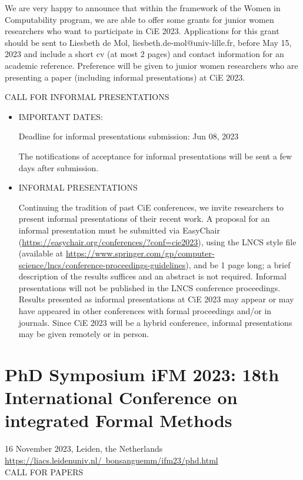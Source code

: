 \documentclass[prodmode,acmtecs]{acmsmall} %
\begin{document}
\begin{itemize}
  We are very happy to announce that within the framework of the Women in Computability program, we are able to offer some grants for junior women researchers who want to participate in CiE 2023. Applications for this grant should be sent to Liesbeth de Mol, liesbeth.de-mol@univ-lille.fr, before May 15, 2023 and include a short cv (at most 2 pages) and contact information for an academic reference. Preference will be given to junior women researchers who are presenting a paper (including informal presentations) at CiE 2023. 
 
\end{itemize}CALL FOR INFORMAL PRESENTATIONS 

\begin{itemize}\item   IMPORTANT DATES: 
 
Deadline for informal presentations submission: Jun 08, 2023 
 
  The notifications of acceptance for informal presentations will be sent a few days after submission. 
 
\item  INFORMAL PRESENTATIONS 
 
  Continuing the tradition of past CiE conferences, we invite researchers to present informal presentations of their recent work. A proposal for an informal presentation must be submitted via EasyChair (\href{https://easychair.org/conferences/?conf=cie2023}{https://easychair.org/conferences/?conf=cie2023}), using the LNCS style file (available at \href{https://www.springer.com/gp/computer-science/lncs/conference-proceedings-guidelines}{https://www.springer.com/gp/computer-science/lncs/conference-proceedings-guidelines}), and be 1 page long; a brief description of the results suffices and an abstract is not required. Informal presentations will not be published in the LNCS conference proceedings. Results presented as informal presentations at CiE 2023 may appear or may have appeared in other conferences with formal proceedings and/or in journals.  Since CiE 2023 will be a hybrid conference, informal presentations may be given remotely or in person. 
 
\end{itemize}\section{PhD Symposium iFM 2023: 18th International Conference on integrated Formal Methods}\label{PhDSymposiumiFM2023}  16 November 2023, Leiden, the Netherlands\\ 
  \href{https://liacs.leidenuniv.nl/~bonsanguemm/ifm23/phd.html}{https://liacs.leidenuniv.nl/~bonsanguemm/ifm23/phd.html}\\ 
CALL FOR PAPERS 
\end{document}

